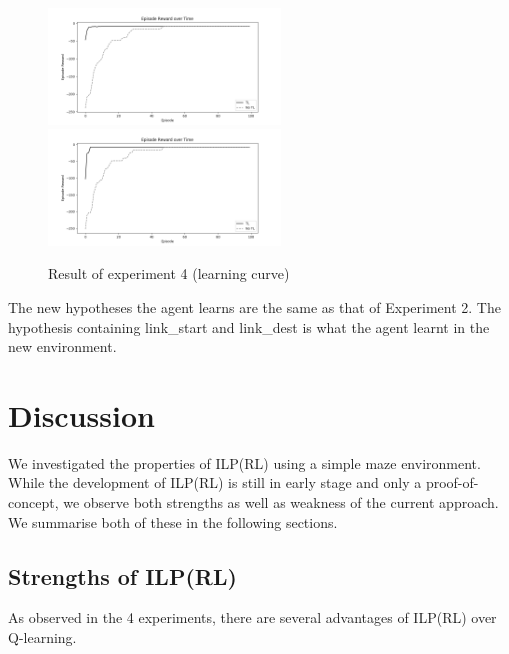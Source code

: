 \begin{figure}[!htb]
\centerline{
\includegraphics[width=0.55\textwidth]{./figures/experiment4_training}
\includegraphics[width=0.55\textwidth]{./figures/experiment4_test}
}
\caption{Result of experiment 4 (learning curve)}
\label{experiment4_training_test}
\end{figure}

The new hypotheses the agent learns are the same as that of Experiment 2. The hypothesis containing \textsf{link\_start} and \textsf{link\_dest} is what the agent learnt in the new environment.



\clearpage

\section{Discussion}
\label{sec:discussion}

We investigated the properties of ILP(RL) using a simple maze environment. While the development of ILP(RL) is still in early stage and only a proof-of-concept, 
we observe both strengths as well as weakness of the current approach. We summarise both of these in the following sections.

\subsection{Strengths of ILP(RL)}
As observed in the 4 experiments, there are several advantages of ILP(RL) over Q-learning.

